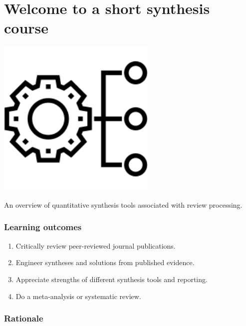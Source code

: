 \documentclass[
]{book}
\author{cjlortie}
\date{}
\providecommand{\tightlist}{%
  \setlength{\itemsep}{0pt}\setlength{\parskip}{0pt}}
\begin{document}
{
\setcounter{tocdepth}{1}
\tableofcontents
}
\hypertarget{welcome-to-a-short-synthesis-course}{%
\chapter{Welcome to a short synthesis course}\label{welcome-to-a-short-synthesis-course}}

\includegraphics[width=3in,height=\textheight]{./synthesis.png}

An overview of quantitative synthesis tools associated with review processing.

\hypertarget{learning-outcomes}{%
\subsection*{Learning outcomes}\label{learning-outcomes}}

\begin{enumerate}
\def\labelenumi{\arabic{enumi}.}
\tightlist
\item
  Critically review peer-reviewed journal publications.\\
\item
  Engineer syntheses and solutions from published evidence.\\
\item
  Appreciate strengths of different synthesis tools and reporting.\\
\item
  Do a meta-analysis or systematic review.
\end{enumerate}

\hypertarget{rationale}{%
\subsection*{Rationale}\label{rationale}}
\end{document}
